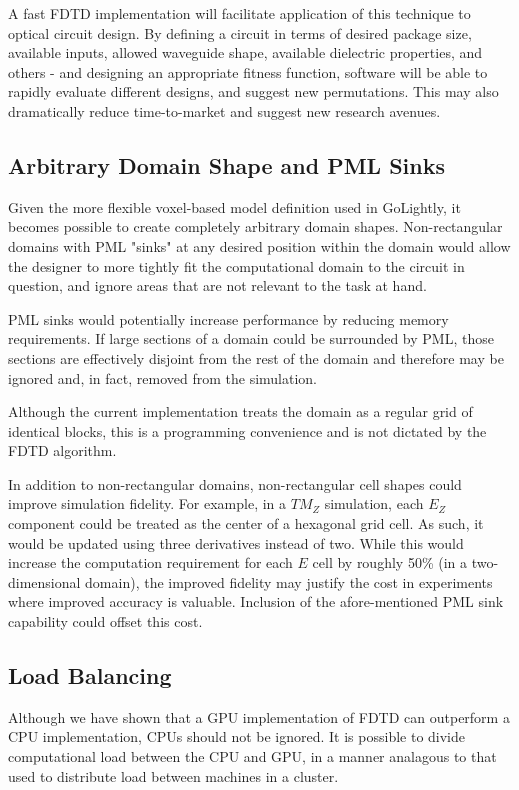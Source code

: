A fast FDTD implementation will facilitate application of this technique to optical circuit design. By defining a circuit in terms of desired package size, available inputs, allowed waveguide shape, available dielectric properties, and others - and designing an appropriate fitness function, software will be able to rapidly evaluate different designs, and suggest new permutations. This may also dramatically reduce time-to-market and suggest new research avenues. 




\subsection{Arbitrary Domain Shape and PML Sinks}
Given the more flexible voxel-based model definition used in GoLightly, it becomes possible to create completely arbitrary domain shapes. Non-rectangular domains with PML "sinks" at any desired position within the domain would allow the designer to more tightly fit the computational domain to the circuit in question, and ignore areas that are not relevant to the task at hand. 

PML sinks would potentially increase performance by reducing memory requirements. If large sections of a domain could be surrounded by PML, those sections are effectively disjoint from the rest of the domain and therefore may be ignored and, in fact, removed from the simulation. 

Although the current implementation treats the domain as a regular grid of identical blocks, this is a programming convenience and is not dictated by the FDTD algorithm.

In addition to non-rectangular domains, non-rectangular cell shapes could improve simulation fidelity. For example, in a $TM_Z$ simulation, each $E_Z$ component could be treated as the center of a hexagonal grid cell. As such, it would be updated using three derivatives instead of two. While this would increase the computation requirement for each $E$ cell by roughly 50\% (in a two-dimensional domain), the improved fidelity may justify the cost in experiments where improved accuracy is valuable. Inclusion of the afore-mentioned PML sink capability could offset this cost. 

\subsection{Load Balancing}
Although we have shown that a GPU implementation of FDTD can outperform a CPU implementation, CPUs should not be ignored. It is possible to divide computational load between the CPU and GPU, in a manner analagous to that used to distribute load between machines in a cluster. 


